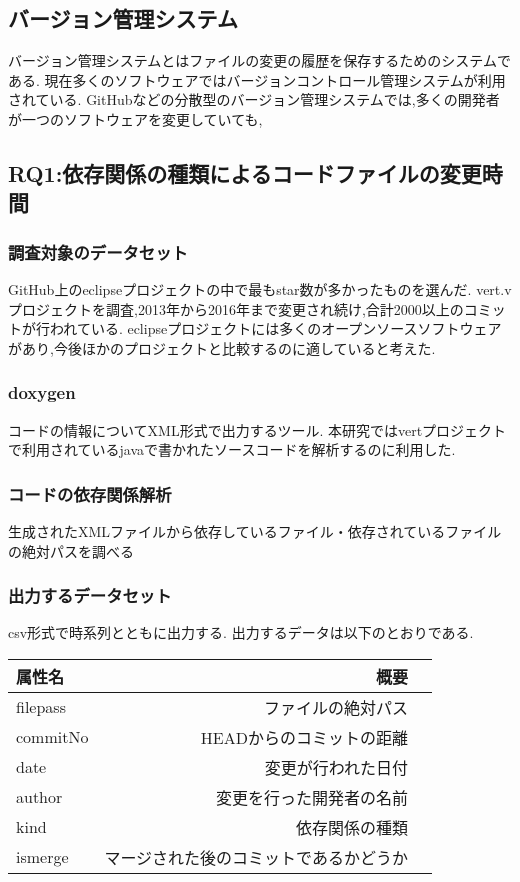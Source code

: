 \documentclass{jsarticle}
\begin{document}
\subsection{バージョン管理システム}
バージョン管理システムとはファイルの変更の履歴を保存するためのシステムである.
現在多くのソフトウェアではバージョンコントロール管理システムが利用されている.
GitHubなどの分散型のバージョン管理システムでは,多くの開発者が一つのソフトウェアを変更していても,


\subsection{RQ1:依存関係の種類によるコードファイルの変更時間}

\subsubsection{調査対象のデータセット}
GitHub上のeclipseプロジェクトの中で最もstar数が多かったものを選んだ.
vert.vプロジェクトを調査,2013年から2016年まで変更され続け,合計2000以上のコミットが行われている.
eclipseプロジェクトには多くのオープンソースソフトウェアがあり,今後ほかのプロジェクトと比較するのに適していると考えた.

\subsubsection{doxygen}
コードの情報についてXML形式で出力するツール.
本研究ではvertプロジェクトで利用されているjavaで書かれたソースコードを解析するのに利用した.

\subsubsection{コードの依存関係解析}
生成されたXMLファイルから依存しているファイル・依存されているファイルの絶対パスを調べる


\subsubsection{出力するデータセット}
csv形式で時系列とともに出力する.
出力するデータは以下のとおりである.

\begin{tabular}{|l|r|r|} \hline
属性名 & 概要 \\ \hline
filepass & ファイルの絶対パス \\ \hline
commitNo & HEADからのコミットの距離 \\ \hline
date & 変更が行われた日付 \\ \hline
author & 変更を行った開発者の名前 \\ \hline
kind & 依存関係の種類 \\ \hline
ismerge & マージされた後のコミットであるかどうか \\ \hline
\end{tabular}
\end{document}
